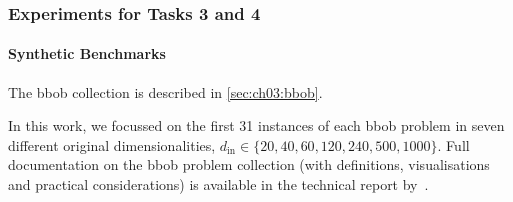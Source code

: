 



\subsubsection{Experiments for Tasks 3 and 4}
\label{sec:ch05:bbo_setup}

\paragraph*{Synthetic Benchmarks}
The \gls{bbob} collection is described in \cref{sec:ch03:bbob}.

In this work, we focussed on the first 31 instances of each \gls{bbob} problem
in seven different original dimensionalities, $d_{\mathrm{in}} \in \{ 20,40,60,120,240,500,1000 \}$.
Full documentation on the \gls{bbob} problem collection (with definitions, visualisations and practical considerations) is available in the technical report by~\citet{FinEtAl09}.
